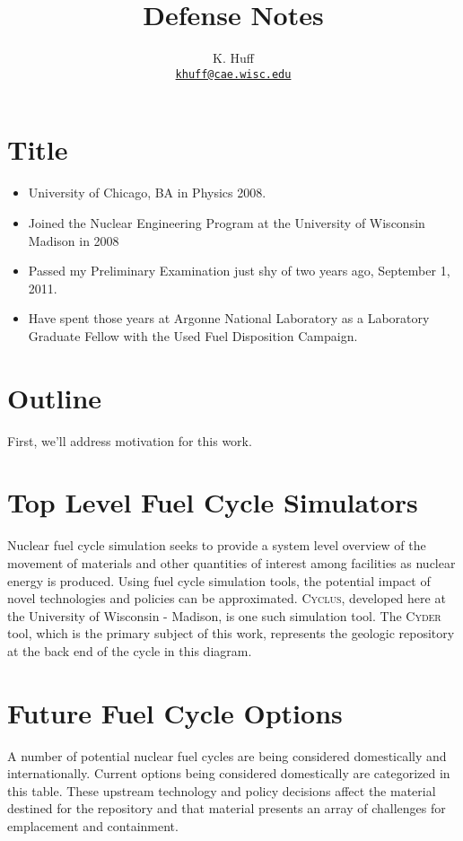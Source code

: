 \documentclass[letterpaper]{article}
\author{K. Huff
\\ \href{mailto:khuff@cae.wisc.edu}{\texttt{khuff@cae.wisc.edu}}
}
\date{}
\title{Defense Notes}
\newcommand{\Cyder}{\textsc{Cyder}\xspace}
\newcommand{\Cyclus}{\textsc{Cyclus}\xspace}
\begin{document}
\maketitle

\section{Title}
\begin{itemize}
\item University of Chicago, BA in Physics 2008.
\item Joined the Nuclear Engineering Program at the University of Wisconsin Madison in 2008 
\item Passed my Preliminary Examination just shy of two years ago, September 1, 2011.
\item Have spent those years at Argonne National Laboratory as a Laboratory 
Graduate Fellow with the Used Fuel Disposition Campaign.
\end{itemize}
\section{Outline}

First, we'll address motivation for this work.

\section{Top Level Fuel Cycle Simulators}

Nuclear fuel cycle simulation seeks to provide a system level overview of the 
movement of materials and other quantities of interest among facilities as 
nuclear energy is produced. Using fuel cycle simulation tools, the potential 
impact of novel technologies and policies can be approximated. \Cyclus, 
developed here at the University of Wisconsin - Madison, is one 
such simulation tool. The \Cyder tool, which is the primary subject of this 
work, represents the geologic repository at the back end of the cycle in this 
diagram. 

\section{Future Fuel Cycle Options}

A number of potential nuclear fuel cycles are being considered domestically and 
internationally. Current options being considered domestically are categorized 
in this table. These upstream technology and policy decisions affect the 
material destined for the repository and that material presents an array of 
challenges for emplacement and containment.  
\end{document}
